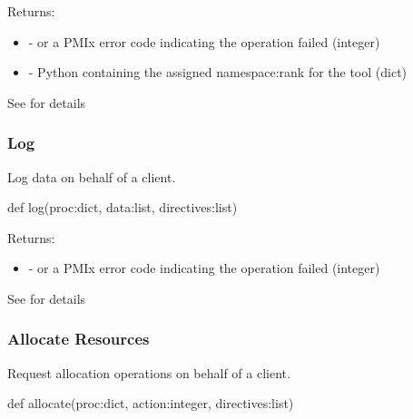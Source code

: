 Returns:
\begin{itemize}
    \item {} -  or a \ac{PMIx} error code indicating the operation failed (integer)
    \item {} - Python  containing the assigned namespace:rank for the tool (dict)
\end{itemize}

See  for details


\subsubsection{Log}

\summary

Log data on behalf of a client.

\format

\pyspecificstart
\begin{codepar}
def log(proc:dict, data:list, directives:list)
\end{codepar}
\pyspecificend

\begin{arglist}
\end{arglist}

Returns:
\begin{itemize}
    \item {} -  or a \ac{PMIx} error code indicating the operation failed (integer)
\end{itemize}

See  for details


\subsubsection{Allocate Resources}

\summary

Request allocation operations on behalf of a client.

\format

\pyspecificstart
\begin{codepar}
def allocate(proc:dict, action:integer, directives:list)
\end{codepar}
\pyspecificend

